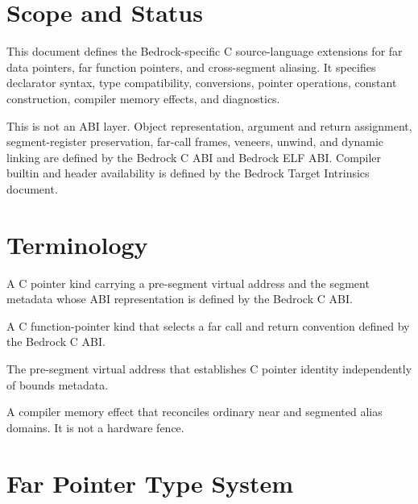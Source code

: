 \documentclass[10pt,twoside]{article}
\begin{document}
\BedrockDocumentHasFiguresfalse
\BedrockFrontMatter

\clearpage
\section{Scope and Status}\label{page:scope-and-status}
This document defines the Bedrock-specific C source-language extensions for far
data pointers, far function pointers, and cross-segment aliasing. It specifies
declarator syntax, type compatibility, conversions, pointer operations,
constant construction, compiler memory effects, and diagnostics.

This is not an ABI layer. Object representation, argument and return
assignment, segment-register preservation, far-call frames, veneers, unwind,
and dynamic linking are defined by the Bedrock C ABI and Bedrock ELF ABI.
Compiler builtin and header availability is defined by the Bedrock Target
Intrinsics document.


\section{Terminology}\label{page:terminology}
\begin{description}[style=nextline,leftmargin=1.75in,labelwidth=1.65in,itemsep=3pt,topsep=3pt]
\item[far data pointer] A C pointer kind carrying a pre-segment virtual address
and the segment metadata whose ABI representation is defined by the Bedrock C
ABI.
\item[far function pointer] A C function-pointer kind that selects a far call
and return convention defined by the Bedrock C ABI.
\item[canonical address] The pre-segment virtual address that establishes C
pointer identity independently of bounds metadata.
\item[cross-segment alias barrier] A compiler memory effect that reconciles
ordinary near and segmented alias domains. It is not a hardware fence.
\end{description}

\section{Far Pointer Type System}\label{page:far-pointer-type-system}
\end{document}
